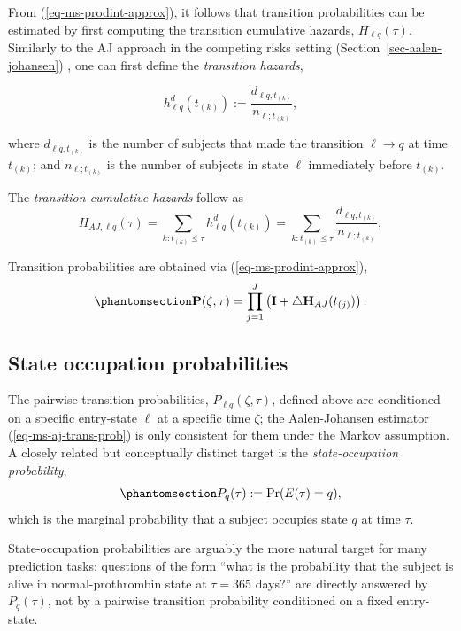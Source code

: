 \documentclass[
  letterpaper,
  krantz2]{style/krantz}
\begin{document}
From (\ref{eq-ms-prodint-approx}), it follows that transition
probabilities can be estimated by first computing the transition
cumulative hazards,
\(H_{\ell q}(\tau)\). Similarly to the AJ approach in the competing
risks setting (Section~\ref{sec-aalen-johansen})
, one can first define the
\emph{transition hazards},

\[
h^{d}_{\ell q}(t_{(k)}):= \frac{d_{\ell q,t_{(k)}}}{n_{\ell; t_{(k)}}},
\]

where \(d_{\ell q,t_{(k)}}\) is the number of subjects that made the
transition \(\ell \rightarrow q\) at time \(t_{(k)}\); and
\(n_{\ell; t_{(k)}}\) is the number of subjects in state \(\ell\)
immediately before \(t_{(k)}\).

The \emph{transition cumulative hazards} follow
as \[
H_{AJ,\ell q}(\tau) = \sum_{k:t_{(k)}\leq \tau} h^d_{\ell q}(t_{(k)}) = \sum_{k:t_{(k)}\leq \tau}\frac{d_{\ell q,t_{(k)}}}{n_{\ell; t_{(k)}}},
\]

Transition probabilities are obtained via
(\ref{eq-ms-prodint-approx}),
\begin{equation}\phantomsection\label{eq-ms-aj-trans-prob}{
\mathbf{P}(\zeta, \tau) = \prod_{j=1}^{J}\left(\mathbf{I} + \triangle\mathbf{H}_{AJ}(t_{(j)})\right).
}\end{equation}

\subsection{State occupation
probabilities}\label{sec-ms-state-occupation}

The pairwise transition probabilities, \(P_{\ell q}(\zeta, \tau)\),
defined above are conditioned on a specific entry-state \(\ell\) at a
specific time \(\zeta\); the Aalen-Johansen estimator
(\ref{eq-ms-aj-trans-prob}) is only consistent for them under the
Markov assumption. A closely related but conceptually
distinct target is the \emph{state-occupation
probability},
\begin{equation}\phantomsection\label{eq-ms-state-occupation}{
P_q(\tau) := \Pr(E(\tau) = q),
}\end{equation} which is the marginal probability that a subject
occupies state \(q\) at time \(\tau\).

State-occupation probabilities are arguably the more natural target for
many prediction tasks: questions of the form ``what is the probability
that the subject is alive in normal-prothrombin state at \(\tau = 365\)
days?'' are directly answered by \(P_q(\tau)\), not by a pairwise
transition probability conditioned on a fixed entry-state.
\end{document}
